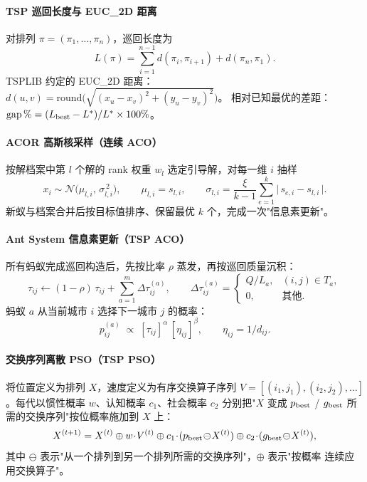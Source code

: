\documentclass[12pt,a4paper,fontset=windows]{ctexart}
\begin{document}
\paragraph{TSP 巡回长度与 EUC\_2D 距离}
对排列 $\pi=(\pi_1,\dots,\pi_n)$，巡回长度为
\[
  L(\pi)=\sum_{i=1}^{n-1} d(\pi_i,\pi_{i+1}) + d(\pi_n,\pi_1).
\]
TSPLIB 约定的 EUC\_2D 距离：$d(u,v)=\mathrm{round}\!\big(\sqrt{(x_u-x_v)^2+(y_u-y_v)^2}\big)$。
相对已知最优的差距：$\mathrm{gap}\,\% = (L_{\rm best}-L^{\ast})/L^{\ast}\times 100\%$。

\paragraph{ACOR 高斯核采样（连续 ACO）}
按解档案中第 $l$ 个解的 rank 权重 $w_l$ 选定引导解，对每一维 $i$ 抽样
\[
  x_i \sim \mathcal{N}\!\Big(\mu_{l,i},\,\sigma_{l,i}^{\,2}\Big),\qquad
  \mu_{l,i} = s_{l,i},\qquad
  \sigma_{l,i} = \frac{\xi}{k-1}\sum_{e=1}^{k}\bigl|\,s_{e,i}-s_{l,i}\,\bigr|.
\]
新蚁与档案合并后按目标值排序、保留最优 $k$ 个，完成一次"信息素更新"。

\paragraph{Ant System 信息素更新（TSP ACO）}
所有蚂蚁完成巡回构造后，先按比率 $\rho$ 蒸发，再按巡回质量沉积：
\[
  \tau_{ij} \leftarrow (1-\rho)\,\tau_{ij} + \sum_{a=1}^{m}\Delta\tau_{ij}^{(a)},\qquad
  \Delta\tau_{ij}^{(a)} =
    \begin{cases}
      Q/L_a, & (i,j)\in T_a, \\
      0, & \text{其他.}
    \end{cases}
\]
蚂蚁 $a$ 从当前城市 $i$ 选择下一城市 $j$ 的概率：
\[
  p_{ij}^{(a)} \;\propto\; [\tau_{ij}]^{\alpha}\,[\eta_{ij}]^{\beta},\qquad \eta_{ij}=1/d_{ij}.
\]

\paragraph{交换序列离散 PSO（TSP PSO）}
将位置定义为排列 $X$，速度定义为有序交换算子序列
$V=[(i_1,j_1),(i_2,j_2),\dots]$。每代以惯性概率 $w$、认知概率 $c_1$、社会概率 $c_2$
分别把"$X$ 变成 $p_{\rm best}$ / $g_{\rm best}$ 所需的交换序列"按位概率施加到 $X$ 上：
\[
  X^{(t+1)} = X^{(t)} \oplus w\!\cdot\! V^{(t)}
              \oplus c_1\!\cdot\!(p_{\rm best}\!\ominus\!X^{(t)})
              \oplus c_2\!\cdot\!(g_{\rm best}\!\ominus\!X^{(t)}),
\]
其中 $\ominus$ 表示"从一个排列到另一个排列所需的交换序列"，$\oplus$ 表示"按概率
连续应用交换算子"。
\end{document}
